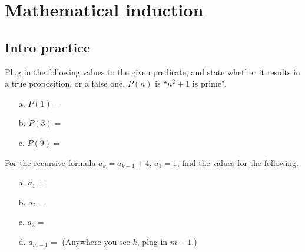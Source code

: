 \documentclass[a4paper,12pt]{book}
\title{}
\author{Rachel Morris}
\date{\today}
\newcounter{question}
\begin{document}
    \togglefalse{answerkey}


    \section{Mathematical induction}

    \subsection{Intro practice}

        \begin{questionNOGRADE}{\thequestion}

            Plug in the following values to the given predicate, and state
            whether it results in a true proposition, or a false one.
            $P(n)$ is ``$n^{2} + 1$ is prime".

            \begin{itemize}
                \item[a.] $P(1) = $ 
                \item[b.] $P(3) = $ 
                \item[c.] $P(9) = $ 
            \end{itemize}
            
        \end{questionNOGRADE}

        \hrulefill

        \begin{questionNOGRADE}{\thequestion}

            For the recursive formula $a_{k} = a_{k-1} + 4$, $a_{1} = 1$,
            find the values for the following.

            \begin{itemize}
                \item[a.] $a_{1} = $    
                \item[b.] $a_{2} = $    
                \item[c.] $a_{3} = $    
                \item[d.] $a_{m-1} = $  (Anywhere you see $k$, plug in $m-1$.)
            \end{itemize}
            
        \end{questionNOGRADE}
\end{document}
